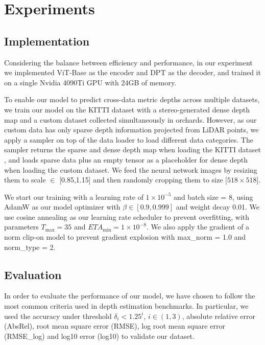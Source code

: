 \documentclass{article}
\begin{document}
\section{Experiments}
    \subsection{Implementation}
        Considering the balance between efficiency and performance, in our experiment we implemented ViT-Base \cite{dosovitskiy2020vit} as the encoder and DPT \cite{dpt} as the decoder, and trained it on a single Nvidia 4090Ti GPU with 24GB of memory.
        
        To enable our model to predict cross-data metric depths across multiple datasets, we train our model on the KITTI dataset with a stereo-generated dense depth map and a custom dataset collected simultaneously in orchards. However, as our custom data has only sparse depth information projected from LiDAR points, we apply a sampler on top of the data loader to load different data categories. The sampler returns the sparse and dense depth map when loading the KITTI dataset \cite{kittdepthbenchmard,kitti}, and loads sparse data plus an empty tensor as a placeholder for dense depth when loading the custom dataset. We feed the neural network images by resizing them to scale \(\in\) [0.85,1.15] and then randomly cropping them to size [$518 \times 518$].

        We start our training with a learning rate of $1 \times 10^{-5}$ and batch size = 8, using AdamW as our model optimizer with $\beta \in [0.9, 0.999]$ and weight decay 0.01. We use cosine annealing as our learning rate scheduler to prevent overfitting, with parameters $T_{\text{max}} = 35$ and $ETA_{\text{min}} = 1 \times 10^{-8}$. We also apply the gradient of a norm clip-on model to prevent gradient explosion with max\_norm = 1.0 and norm\_type = 2.
        
    \subsection{Evaluation}
        In order to evaluate the performance of our model, we have chosen to follow the most common criteria used in depth estimation benchmarks. In particular, we used the accuracy under threshold \(\delta_{i} < 1.25^{i}\), \(i \in (1,3)\), absolute relative error (AbsRel), root mean square error (RMSE), log root mean square error (RMSE\_log) and log10 error (log10) to validate our dataset.
\end{document}
